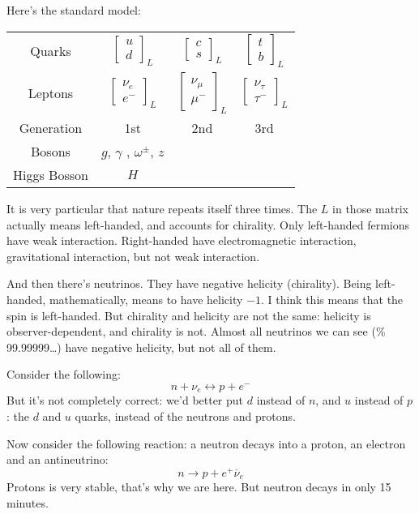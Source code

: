 Here's the standard model:
\begin{tabular}{c c c c}
Quarks & $\begin{bmatrix} u\\d \end{bmatrix}_L $ & $\begin{bmatrix} c\\s
\end{bmatrix}_L$ & $\begin{bmatrix} t\\b \end{bmatrix}_L$\\
Leptons & $\begin{bmatrix} \nu_e\\e^- \end{bmatrix}_L $ & $\begin{bmatrix}
\nu_\mu\\ \mu^-
\end{bmatrix}_L$ & $\begin{bmatrix} \nu_\tau\\ \tau^- \end{bmatrix}_L$\\
Generation & 1st & 2nd & 3rd\\
Bosons & $g$, $\gamma$ , $\omega^\pm$, $z$ \\
Higgs Bosson & $H$
\end{tabular}
It is very particular that nature repeats itself three times. The $L$ in those
matrix actually means left-handed, and accounts for chirality. Only left-handed
fermions have weak interaction. Right-handed have electromagnetic interaction,
gravitational interaction, but not weak interaction.

\medskip

And then there's neutrinos. They have negative helicity (chirality). Being
left-handed, mathematically, means to have helicity $-1$. I think this means
that the spin is left-handed. But chirality and helicity are not the same:
helicity is observer-dependent, and chirality is not. Almost all neutrinos we
can see (\% 99.99999…) have negative helicity, but not all of them.

Consider the following:
$$
n+\nu_e\leftrightarrow p+e^-
$$
But it's not completely correct: we'd better put $d$ instead of $n$, and $u$
instead of $p$: the $d$ and $u$ quarks, instead of the neutrons and protons.

Now consider the following reaction: a neutron decays into a proton, an electron
and an antineutrino:
$$
n\to p+e^+\overline{\nu}_e
$$
Protons is very stable, that's why we are here. But neutron decays in only 15
minutes.

